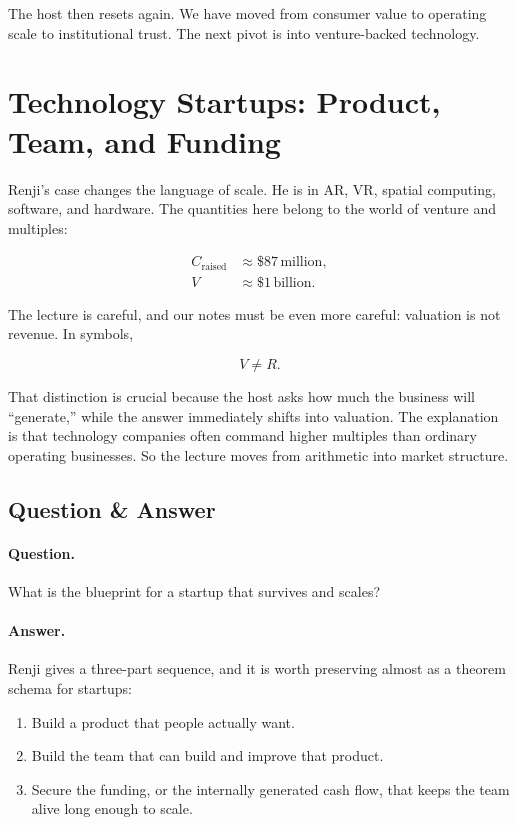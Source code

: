 The host then resets again. We have moved from consumer value to operating scale to institutional trust. The next pivot is into venture-backed technology.

\section{Technology Startups: Product, Team, and Funding}

Renji's case changes the language of scale. He is in AR, VR, spatial computing, software, and hardware. The quantities here belong to the world of venture and multiples:

\begin{align}
C_{\text{raised}} &\approx \$87\,\text{million},\\
V &\approx \$1\,\text{billion}.
\end{align}

The lecture is careful, and our notes must be even more careful: valuation is not revenue. In symbols,

\begin{equation}
V \neq R.
\end{equation}

That distinction is crucial because the host asks how much the business will ``generate,'' while the answer immediately shifts into valuation. The explanation is that technology companies often command higher multiples than ordinary operating businesses. So the lecture moves from arithmetic into market structure.

\subsection{Question \& Answer}

\paragraph{Question.} What is the blueprint for a startup that survives and scales?

\paragraph{Answer.} Renji gives a three-part sequence, and it is worth preserving almost as a theorem schema for startups:

\begin{enumerate}
\item Build a product that people actually want.
\item Build the team that can build and improve that product.
\item Secure the funding, or the internally generated cash flow, that keeps the team alive long enough to scale.
\end{enumerate}

